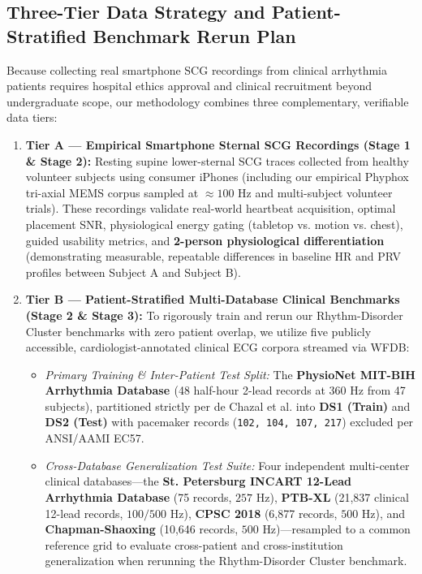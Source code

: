 \subsection{Three-Tier Data Strategy and Patient-Stratified Benchmark Rerun Plan}
Because collecting real smartphone SCG recordings from clinical arrhythmia patients requires hospital ethics approval and clinical recruitment beyond undergraduate scope, our methodology combines three complementary, verifiable data tiers:
\begin{enumerate}
	\item \textbf{Tier A --- Empirical Smartphone Sternal SCG Recordings (Stage 1 \& Stage 2):} Resting supine lower-sternal SCG traces collected from healthy volunteer subjects using consumer iPhones (including our empirical Phyphox tri-axial MEMS corpus sampled at $\approx 100\text{ Hz}$ and multi-subject volunteer trials). These recordings validate real-world heartbeat acquisition, optimal placement SNR, physiological energy gating (tabletop vs. motion vs. chest), guided usability metrics, and \textbf{2-person physiological differentiation} (demonstrating measurable, repeatable differences in baseline HR and PRV profiles between Subject A and Subject B).
	\item \textbf{Tier B --- Patient-Stratified Multi-Database Clinical Benchmarks (Stage 2 \& Stage 3):} To rigorously train and rerun our Rhythm-Disorder Cluster benchmarks with zero patient overlap, we utilize five publicly accessible, cardiologist-annotated clinical ECG corpora streamed via WFDB:
	\begin{itemize}
		\item \textit{Primary Training \& Inter-Patient Test Split:} The \textbf{PhysioNet MIT-BIH Arrhythmia Database \cite{goldberger2000physiobank}} (48 half-hour 2-lead records at $360\text{ Hz}$ from 47 subjects), partitioned strictly per de Chazal et al. \cite{dechazal2004automatic} into \textbf{DS1 (Train)} and \textbf{DS2 (Test)} with pacemaker records (\texttt{102, 104, 107, 217}) excluded per ANSI/AAMI EC57.
		\item \textit{Cross-Database Generalization Test Suite:} Four independent multi-center clinical databases---the \textbf{St. Petersburg INCART 12-Lead Arrhythmia Database} (75 records, $257\text{ Hz}$), \textbf{PTB-XL} (21,837 clinical 12-lead records, $100/500\text{ Hz}$), \textbf{CPSC 2018} (6,877 records, $500\text{ Hz}$), and \textbf{Chapman-Shaoxing} (10,646 records, $500\text{ Hz}$)---resampled to a common reference grid to evaluate cross-patient and cross-institution generalization when rerunning the Rhythm-Disorder Cluster benchmark.

\end{itemize}
\end{enumerate}
